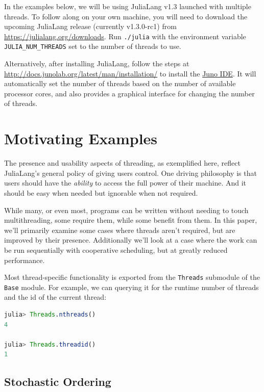 \documentclass{juliacon}
\begin{document}
\begin{calloutbox}
In the examples below, we will be using JuliaLang v1.3 launched with multiple threads.
To follow along on your own machine, you will need to download the upcoming JuliaLang release (currently v1.3.0-rc1) from \url{https://julialang.org/downloads}.
Run \verb|./julia| with the environment variable \verb|JULIA_NUM_THREADS| set to the number of threads to use.

Alternatively, after installing JuliaLang, follow the steps at \url{http://docs.junolab.org/latest/man/installation/} to install the \href{https://junolab.org}{Juno IDE}. It will automatically set the number of threads based on the number of available processor cores, and also provides a graphical interface for changing the number of threads.
\end{calloutbox}

\section{Motivating Examples}
\label{subsub:motivation}

The presence and usability aspects of threading, as exemplified here, reflect JuliaLang's general policy of giving users control. One driving philosophy is that users should have the \textit{ability} to access the full power of their machine. And it should be easy when needed but ignorable when not required.

While many, or even most, programs can be written without needing to touch multithreading, some require them, while some benefit from them. In this paper, we'll primarily examine some cases where threads aren't required, but are improved by their presence. Additionally we'll look at a case where the work can be run sequentially with cooperative scheduling, but at greatly reduced performance.

Most thread-specific functionality is exported from the \verb|Threads| submodule of the \verb|Base| module. For example, we can querying it for the runtime number of threads and the id of the current thread:

\begin{lstlisting}[language = Julia]
julia> Threads.nthreads()
4

julia> Threads.threadid()
1
\end{lstlisting}

\subsection{Stochastic Ordering}
\label{subsub:pprint}
\end{document}
